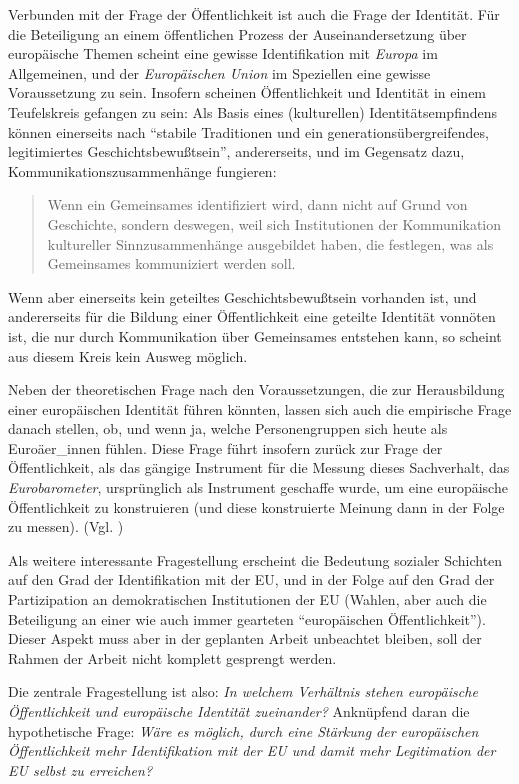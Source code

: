 \documentclass[a4paper, german, oneside]{scrartcl}
\begin{document}
Verbunden mit der Frage der Öffentlichkeit ist auch die Frage der Identität. Für die Beteiligung an einem öffentlichen Prozess der Auseinandersetzung über europäische Themen scheint eine gewisse Identifikation mit \emph{Europa} im Allgemeinen, und der \emph{Europäischen Union} im Speziellen eine gewisse Voraussetzung zu sein. Insofern scheinen Öffentlichkeit und Identität in einem Teufelskreis gefangen zu sein: Als Basis eines (kulturellen) Identitätsempfindens können einerseits nach \textcite[28]{segers_konstruktion_1999} \enquote{stabile Traditionen und ein generationsübergreifendes, legitimiertes Geschichtsbewußtsein}, andererseits, und im Gegensatz dazu, Kommunikationszusammenhänge fungieren:  \blockquote[{\cite[160]{eder_integration_1999}}]{Wenn ein Gemeinsames identifiziert wird, dann nicht auf Grund von Geschichte, sondern deswegen, weil sich Institutionen der Kommunikation kultureller Sinnzusammenhänge ausgebildet haben, die festlegen, was als Gemeinsames kommuniziert werden soll.} Wenn aber einerseits kein geteiltes Geschichtsbewußtsein vorhanden ist, und andererseits für die Bildung einer Öffentlichkeit eine geteilte Identität vonnöten ist, die nur durch Kommunikation über Gemeinsames entstehen kann, so scheint aus diesem Kreis kein Ausweg möglich.

Neben der theoretischen Frage nach den Voraussetzungen, die zur Herausbildung einer europäischen Identität führen könnten, lassen sich auch die empirische Frage danach stellen, ob, und wenn ja, welche Personengruppen sich heute als Euroäer\_innen fühlen. Diese Frage führt insofern zurück zur Frage der Öffentlichkeit, als das gängige Instrument für die Messung dieses Sachverhalt, das \emph{Eurobarometer}, ursprünglich als Instrument geschaffe wurde, um eine europäische Öffentlichkeit zu konstruieren (und diese konstruierte Meinung dann in der Folge zu messen).
 (Vgl. \textcite[542]{weichbold_eurobarometer_2009})


Als weitere interessante Fragestellung erscheint die Bedeutung sozialer Schichten auf den Grad der Identifikation mit der EU, und in der Folge auf den Grad der Partizipation an demokratischen Institutionen der EU (Wahlen, aber auch die Beteiligung an einer wie auch immer gearteten \enquote{europäischen Öffentlichkeit}). Dieser Aspekt muss aber in der geplanten Arbeit unbeachtet bleiben, soll der Rahmen der Arbeit nicht komplett gesprengt werden.


Die zentrale Fragestellung ist also: \emph{In welchem Verhältnis stehen europäische Öffentlichkeit und europäische Identität zueinander?} Anknüpfend daran die hypothetische Frage: \emph{Wäre es möglich, durch eine Stärkung der europäischen Öffentlichkeit mehr Identifikation mit der EU und damit mehr Legitimation der EU selbst zu erreichen?}
\end{document}
